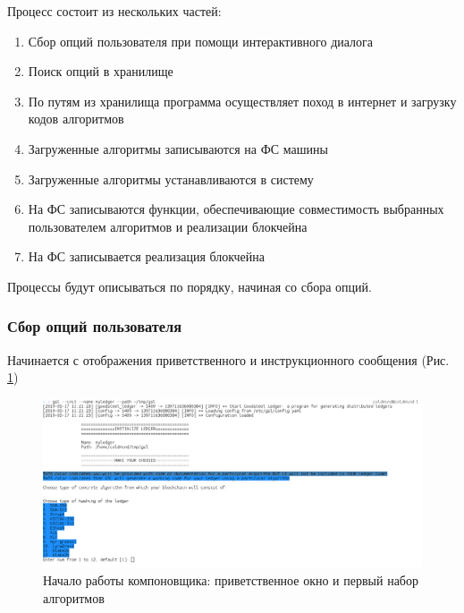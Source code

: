 Процесс состоит из нескольких частей:
\begin{enumerate}
    \item Сбор опций пользователя при помощи интерактивного диалога
    \item Поиск опций в хранилище
    \item По путям из хранилища программа осуществляет поход в интернет и
          загрузку кодов алгоритмов
    \item Загруженные алгоритмы записываются на ФС машины
    \item Загруженные алгоритмы устанавливаются в систему
    \item На ФС записываются функции, обеспечивающие совместимость выбранных
          пользователем алгоритмов и реализации блокчейна
    \item На ФС записывается реализация блокчейна
\end{enumerate}

Процессы будут описываться по порядку, начиная со сбора опций.

\subsubsection{Сбор опций пользователя}

Начинается с отображения приветственного и инструкционного сообщения (Рис. \ref{dg_st})

\begin{figure}[h]
    \centering
    \includegraphics[width=\textwidth]{images/dialog_start}
    \caption{Начало работы компоновщика: приветственное окно и первый набор алгоритмов}\label{dg_st}
\end{figure}

